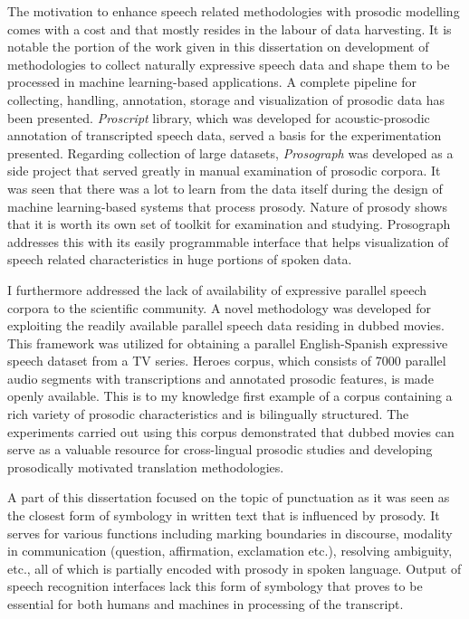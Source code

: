 The motivation to enhance speech related methodologies with prosodic modelling comes with a cost and that mostly resides in the labour of data harvesting. It is notable the portion of the work given in this dissertation on development of methodologies to collect naturally expressive speech data and shape them to be processed in machine learning-based applications. A complete pipeline for collecting, handling, annotation, storage and visualization of prosodic data has been presented. \textit{Proscript} library, which was developed for acoustic-prosodic annotation of transcripted speech data, served a basis for the experimentation presented. Regarding collection of large datasets, \textit{Prosograph} was developed as a side project that served greatly in manual examination of prosodic corpora. It was seen that there was a lot to learn from the data itself during the design of machine learning-based systems that process prosody. Nature of prosody shows that it is worth its own set of toolkit for examination and studying. Prosograph addresses this with its easily programmable interface that helps visualization of speech related characteristics in huge portions of spoken data. 

I furthermore addressed the lack of availability of expressive parallel speech corpora to the scientific community. A novel methodology was developed for exploiting the readily available parallel speech data residing in dubbed movies. This framework was utilized for obtaining a parallel English-Spanish expressive speech dataset from a TV series. Heroes corpus, which consists of 7000 parallel audio segments with transcriptions and annotated prosodic features, is made openly available. This is to my knowledge first example of a corpus containing a rich variety of prosodic characteristics and is bilingually structured. The experiments carried out using this corpus demonstrated that dubbed movies can serve as a valuable resource for cross-lingual prosodic studies and developing prosodically motivated translation methodologies. 

A part of this dissertation focused on the topic of punctuation as it was seen as the closest form of symbology in written text that is influenced by prosody. It serves for various functions including marking boundaries in discourse, modality in communication (question, affirmation, exclamation etc.), resolving ambiguity, etc., all of which is partially encoded with prosody in spoken language. Output of speech recognition interfaces lack this form of symbology that proves to be essential for both humans and machines in processing of the transcript. 

